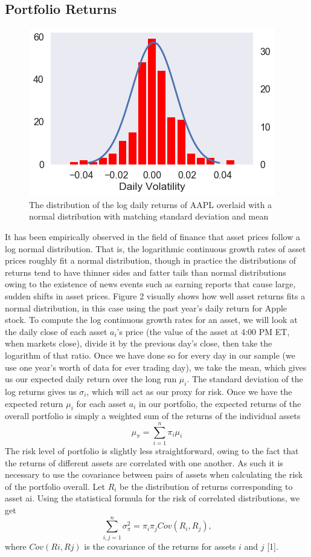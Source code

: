 \documentclass{article}
\begin{document}
\subsection{Portfolio Returns}
\begin{figure}
\includegraphics[scale=0.3]{aaplnormal}
\caption{The distribution of the log daily returns of AAPL overlaid with a normal distribution with matching standard deviation and mean}
\end{figure}
It has been empirically observed in the field of finance that asset prices follow a log normal distribution. That is, the logarithmic continuous growth rates of asset prices roughly fit a normal distribution, though in practice the distributions of returns tend to have thinner sides and fatter tails than normal distributions owing to the existence of news events such as earning reports that cause large, sudden shifts in asset prices. Figure 2 visually shows how well asset returns fits a normal distribution, in this case using the past year’s daily return for Apple stock.
To compute the log continuous growth rates for an asset,
we will look at the daily close of each asset $a_i$’s price (the
value of the asset at 4:00 PM ET, when markets close), divide it by the previous day's close, then take the logarithm
of that ratio. Once we have done so for every day in our
sample (we use one year’s worth of data for ever trading day), we take the mean, which gives us our expected daily return over the long run $\mu_i$. The standard deviation of the log returns gives us $\sigma_i$, which will act as our proxy for risk.
Once we have the expected return $\mu_i$ for each asset $a_i$ in our portfolio, the expected returns of the overall portfolio is simply a weighted sum of the returns of the individual assets
\begin{equation}
\mu_\pi = \sum_{i=1}^n \pi_i \mu_i
\end{equation}
The risk level of portfolio is slightly less straightforward, owing to the fact that the returns of different assets are correlated with one another. As such it is necessary to use the covariance between pairs of assets when calculating the risk of the portfolio overall. Let $R_i$ be the distribution of returns corresponding to asset ai. Using the statistical formula for the risk of correlated distributions, we get
\begin{equation}
 \sum_{i,j=1}^n \sigma_\pi^2 = \pi_i \pi_j Cov(R_i,R_j),
\end{equation}
where $Cov(Ri,Rj)$ is the covariance of the returns for assets $i$ and $j$ [1].
\end{document}
